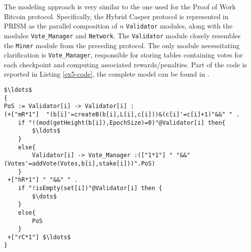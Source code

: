The modeling approach is very similar to the one used for the Proof of Work Bitcoin protocol. Specifically, the Hybrid Casper protocol is represented in PRISM as the parallel composition of $n$ \texttt{Validator} modules, along with the modules \texttt{Vote\_Manager} and \texttt{Network}. The \texttt{Validator} module closely resembles the \texttt{Miner} module from the preceding protocol. The only module necessitating clarification is \texttt{Vote\_Manager}, responsible for storing tables containing votes for each checkpoint and computing associated rewards/penalties.
Part of the code is reported in Listing \ref{ex5-code}, the complete model can be found in \cite{repository}. 
\begin{lstlisting}[style=chor-color,tabsize=2,breaklines=true, postbreak=\mbox{\textcolor{red}{$\hookrightarrow$}\space},	caption={Choreographic language for the Hybrid Casper Protocol.},captionpos=b,label={ex5-code}]
$\ldots$
{
PoS := Validator[i] -> Validator[i] :
(+["mR*1"]  "(b[i]'=createB(b[i],L[i],c[i]))&(c[i]'=c[i]+1)"&&" " .
	if "!(mod(getHeight(b[i]),EpochSize)=0)"@Validator[i] then{
		$\ldots$
	}
	else{
		Validator[i] -> Vote_Manager :(["1*1"] " "&&"(Votes'=addVote(Votes,b[i],stake[i]))".PoS)
	}
 +["hR*1"] " "&&" " . 
 	if "!isEmpty(set[i])"@Validator[i] then {
 		$\dots$
 	}
 	else{
 		PoS
 	}
 +["rC*1"] $\ldots$							
}

\end{lstlisting}
